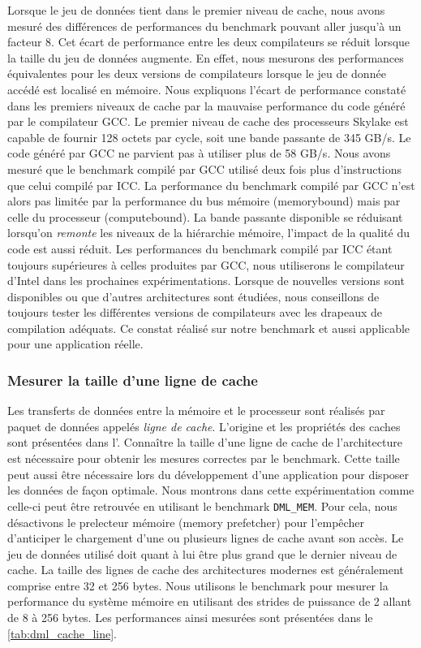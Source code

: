         Lorsque le jeu de données tient dans le premier niveau de cache, nous avons mesuré des différences de performances du benchmark pouvant aller jusqu'à un facteur 8. Cet écart de performance entre les deux compilateurs se réduit lorsque la taille du jeu de données augmente. En effet, nous mesurons des performances équivalentes pour les deux versions de compilateurs lorsque le jeu de donnée accédé est localisé en mémoire. Nous expliquons l'écart de performance constaté dans les premiers niveaux de cache par la mauvaise performance du code généré par le compilateur GCC. Le premier niveau de cache des processeurs Skylake est capable de fournir 128 octets par cycle, soit une bande passante de 345 GB/s. Le code généré par GCC ne parvient pas à utiliser plus de 58 GB/s. Nous avons mesuré que le benchmark compilé par GCC utilisé deux fois plus d'instructions que celui compilé par ICC. La performance du benchmark compilé par GCC n'est alors pas limitée par la performance du bus mémoire (\gls{memorybound}) mais par celle du processeur (\gls{computebound}). La bande passante disponible se réduisant lorsqu'on \textit{remonte} les niveaux de la hiérarchie mémoire, l'impact de la qualité du code est aussi réduit. Les performances du benchmark compilé par ICC étant toujours supérieures à celles produites par GCC, nous utiliserons le compilateur d'Intel dans les prochaines expérimentations. Lorsque de nouvelles versions sont disponibles ou que d'autres architectures sont étudiées, nous conseillons de toujours tester les différentes versions de compilateurs avec les drapeaux de compilation adéquats. Ce constat réalisé sur notre benchmark et aussi applicable pour une application réelle.
    
    
    \subsubsection{Mesurer la taille d'une ligne de cache}
    
        Les transferts de données entre la mémoire et le processeur sont réalisés par paquet de données appelés \textit{ligne de cache}. L'origine et les propriétés des caches sont présentées dans l'. Connaître la taille d'une ligne de cache de l'architecture est nécessaire pour obtenir les mesures correctes par le benchmark. Cette taille peut aussi être nécessaire lors du développement d'une application pour disposer les données de façon optimale. Nous montrons dans cette expérimentation comme celle-ci peut être retrouvée en utilisant le benchmark \verb=DML_MEM=. Pour cela, nous désactivons le \gls{prelecteur} mémoire (memory prefetcher) pour l'empêcher d'anticiper le chargement d'une ou plusieurs lignes de cache avant son accès. Le jeu de données utilisé doit quant à lui être plus grand que le dernier niveau de cache. La taille des lignes de cache des architectures modernes est généralement comprise entre 32 et 256 bytes. Nous utilisons le benchmark pour mesurer la performance du système mémoire en utilisant des \glspl{stride} de puissance de 2 allant de 8 à 256 bytes. Les performances ainsi mesurées sont présentées dans le \autoref{tab:dml_cache_line}.
    
